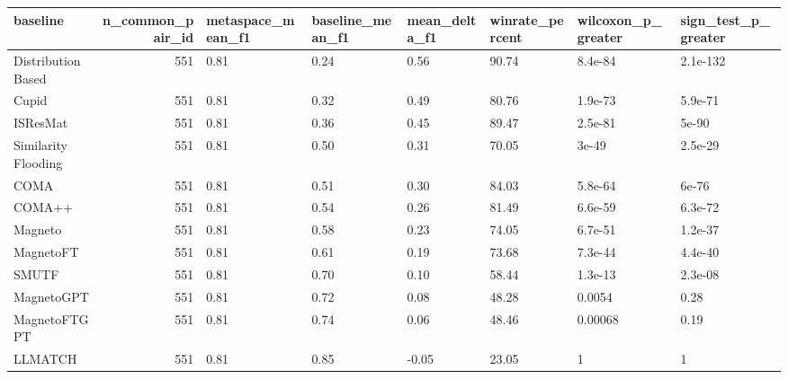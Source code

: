 \begin{tabular}{lrllllll}
\toprule
baseline & n\_common\_pair\_id & metaspace\_mean\_f1 & baseline\_mean\_f1 & mean\_delta\_f1 & winrate\_percent & wilcoxon\_p\_greater & sign\_test\_p\_greater \\
\midrule
Distribution Based & 551 & 0.81 & 0.24 & 0.56 & 90.74 & 8.4e-84 & 2.1e-132 \\
Cupid & 551 & 0.81 & 0.32 & 0.49 & 80.76 & 1.9e-73 & 5.9e-71 \\
ISResMat & 551 & 0.81 & 0.36 & 0.45 & 89.47 & 2.5e-81 & 5e-90 \\
Similarity Flooding & 551 & 0.81 & 0.50 & 0.31 & 70.05 & 3e-49 & 2.5e-29 \\
COMA & 551 & 0.81 & 0.51 & 0.30 & 84.03 & 5.8e-64 & 6e-76 \\
COMA++ & 551 & 0.81 & 0.54 & 0.26 & 81.49 & 6.6e-59 & 6.3e-72 \\
Magneto & 551 & 0.81 & 0.58 & 0.23 & 74.05 & 6.7e-51 & 1.2e-37 \\
MagnetoFT & 551 & 0.81 & 0.61 & 0.19 & 73.68 & 7.3e-44 & 4.4e-40 \\
SMUTF & 551 & 0.81 & 0.70 & 0.10 & 58.44 & 1.3e-13 & 2.3e-08 \\
MagnetoGPT & 551 & 0.81 & 0.72 & 0.08 & 48.28 & 0.0054 & 0.28 \\
MagnetoFTGPT & 551 & 0.81 & 0.74 & 0.06 & 48.46 & 0.00068 & 0.19 \\
LLMATCH & 551 & 0.81 & 0.85 & -0.05 & 23.05 & 1 & 1 \\
\bottomrule
\end{tabular}
